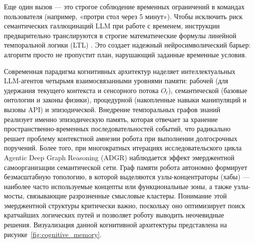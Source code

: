 Еще один вызов — это строгое соблюдение временных ограничений в командах пользователя (например, «протри стол через 5 минут»). Чтобы исключить риск семантических галлюцинаций LLM при работе с временем, инструкции предварительно транслируются в строгие математические формулы линейной темпоральной логики (LTL) \cite{ref29}. Это создает надежный нейросимволический барьер: алгоритм просто не пропустит план, нарушающий заданные временные условия.

Современная парадигма когнитивных архитектур наделяет интеллектуальных LLM-агентов четырьмя взаимосвязанными уровнями памяти: рабочей (для удержания текущего контекста и сенсорного потока $O_t$), семантической (базовые онтологии и законы физики), процедурной (накопленные навыки манипуляций и вызовы API) и эпизодической. Внедрение темпоральных графов знаний реализует именно эпизодическую память, которая отвечает за хранение пространственно-временных последовательностей событий, что радикально решает проблему контекстной амнезии робота при выполнении долгосрочных поручений. Более того, при многократных итерациях исследовательского цикла Agentic Deep Graph Reasoning (ADGR) наблюдается эффект эмерджентной самоорганизации семантической сети. Граф памяти робота автономно формирует безмасштабную топологию, в которой выделяются узлы-концентраторы (хабы) — наиболее часто используемые концепты или функциональные зоны, а также узлы-мосты, связывающие разрозненные смысловые кластеры. Понимание этой эмерджентной структуры критически важно, поскольку оно оптимизирует поиск кратчайших логических путей и позволяет роботу выводить неочевидные решения. Визуализация данной когнитивной архитектуры представлена на рисунке~\ref{fig:cognitive_memory}.

